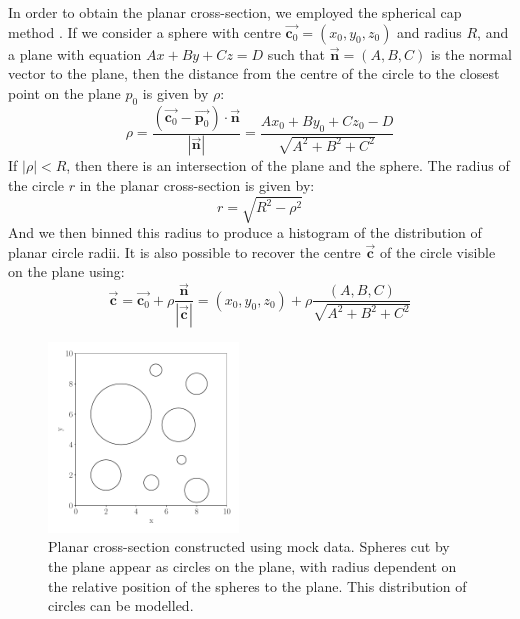 \documentclass[journal]{IEEEtran}
\begin{document}
In order to obtain the planar cross-section, we employed the spherical cap
method . If we consider a sphere with centre
$\overrightarrow{\textbf{c}_0} = (x_0, y_0, z_0)$ and radius $R$, and a plane
with equation $Ax + By + Cz = D$ such that $\overrightarrow{\textbf{n}} = (A, B,
C)$ is the normal vector to the plane, then the distance from the centre of the
circle to the closest point on the plane $p_0$ is given by $\rho$:
\begin{equation*}
\rho = \frac{(\overrightarrow{\textbf{c}_0} - \overrightarrow{\textbf{p}_0}) \cdot{}
  \overrightarrow{\textbf{n}}}{|\overrightarrow{\textbf{n}}|} = \frac{Ax_0 +
  By_0 + Cz_0 - D}{\sqrt{A^2 + B^2 + C^2}}
\end{equation*}
If $|\rho| < R$, then there is an intersection of the plane and the sphere. The
radius of the circle $r$ in the planar cross-section is given by:
\begin{equation*}
r = \sqrt{R^2 - \rho^2}
\end{equation*}
And we then binned this radius to produce a histogram of the distribution of
planar circle radii. It is also possible to recover the centre
$\overrightarrow{\textbf{c}}$ of the circle visible on the plane using:
\begin{equation*}
\overrightarrow{\textbf{c}} = \overrightarrow{\textbf{c}_0} +
\rho\frac{\overrightarrow{\textbf{n}}}{|\overrightarrow{\textbf{c}}|} = (x_0,
y_0, z_0) + \rho\frac{(A, B, C)}{\sqrt{A^2 + B^2 + C^2}}
\end{equation*}

\begin{figure}[H]%
\begin{center}
\includegraphics[width=0.45\textwidth]{./../Figures/circles.pdf}
\caption{Planar cross-section constructed using mock data. Spheres cut by the
  plane appear as circles on the plane, with radius dependent on the relative
  position of the spheres to the plane. This distribution of circles can be
  modelled.}\label{fig:circles}
\end{center}
\end{figure}
\end{document}
